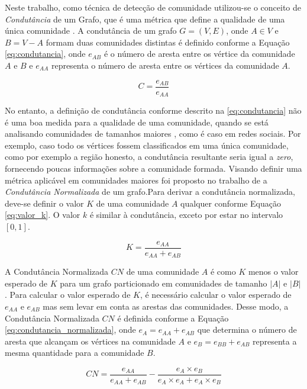 \documentclass[12pt]{article}
\begin{document}
Neste trabalho, como técnica de detecção de comunidade utilizou-se o conceito de \textit{Condutância} de um Grafo, que é uma métrica que define a qualidade de uma única comunidade \cite{kannan2004clusterings}. A condutância de um grafo $G = (V, E)$, onde $A \in V$ e $B = V-A$ formam duas comunidades distintas é definido conforme a Equação \ref{eq:condutancia}, onde $e_{AB}$  é o número de aresta entre os vértice da comunidade $A$ e $B$ e $e_{AA}$ representa o número de aresta entre os vértices da comunidade $A$.

\begin{equation} \label{eq:condutancia}
C = \frac{e_{AB}}{e_{AA}} 
\end{equation}

No entanto, a definição de condutância conforme descrito na \ref{eq:condutancia} não é uma boa medida para a qualidade de uma comunidade, quando  se está analisando comunidades de tamanhos maiores \cite{mislove2010you}, como é caso em redes sociais. Por exemplo, caso todo os vértices fossem classificados em uma única comunidade, como por exemplo a região honesto, a condutância resultante seria igual a \textit{zero}, fornecendo poucas informações sobre a comunidade formada. Visando definir uma métrica aplicável em comunidades maiores foi proposto no trabalho de \cite{mislove2010you} a \textit{Condutância Normalizada} de um grafo.Para derivar a condutância normalizada, deve-se definir o valor $K$ de uma comunidade $A$ qualquer conforme Equação \ref{eq:valor_k}. O valor $k$  é similar à condutância, exceto por estar no intervalo $[0, 1]$. 

\begin{equation} \label{eq:valor_k}
K = \frac{e_{AA}}{e_{AA} + e_{AB}} 
\end{equation}

A Condutância Normalizada $CN$ de uma comunidade $A$ é como $K$ menos o valor esperado de $K$ para um grafo particionado em comunidades de tamanho $|A|$ e $|B|$. Para calcular o valor esperado de $K$, é necessário calcular o valor esperado de $e_{AA}$ e $e_{AB}$ mas sem levar em conta as arestas das comunidades.
Desse modo, a Condutância Normalizada $CN$ é definida conforme a Equação \ref{eq:condutancia_normalizada}, onde $e_A= e_{AA} + e_{AB}$ que determina o número de aresta que alcançam os vértices na comunidade $A$ e $e_B = e_{BB} + e_{AB}$ representa a mesma quantidade para a comunidade $B$.

\begin{equation} \label{eq:condutancia_normalizada}
CN = \frac{e_{AA}}{e_{AA} + e_{AB}}  - \frac{e_A \times e_B}{e_A \times e_A + e_A \times e_B}
\end{equation}
\end{document}
